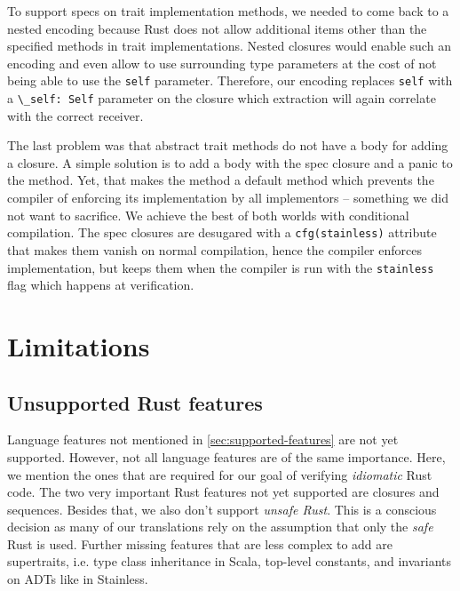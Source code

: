 To support specs on trait implementation methods, we needed to come back
to a nested encoding because Rust does not allow additional items other
than the specified methods in trait implementations. Nested closures
would enable such an encoding and even allow to use surrounding type
parameters at the cost of not being able to use the
\passthrough{\lstinline!self!} parameter. Therefore, our encoding
replaces \passthrough{\lstinline!self!} with a
\passthrough{\lstinline!\_self: Self!} parameter on the closure which
extraction will again correlate with the correct receiver.

The last problem was that abstract trait methods do not have a body for
adding a closure. A simple solution is to add a body with the spec
closure and a panic to the method. Yet, that makes the method a default
method which prevents the compiler of enforcing its implementation by
all implementors -- something we did not want to sacrifice. We achieve
the best of both worlds with conditional compilation. The spec closures
are desugared with a \passthrough{\lstinline!cfg(stainless)!} attribute
that makes them vanish on normal compilation, hence the compiler
enforces implementation, but keeps them when the compiler is run with
the \passthrough{\lstinline!stainless!} flag which happens at
verification.



\section{Limitations}
\label{impl-limitations}

\subsection{Unsupported Rust features}

Language features not mentioned in \autoref{sec:supported-features} are not yet
supported. However, not all language features are of the same importance. Here,
we mention the ones that are required for our goal of verifying \emph{idiomatic}
Rust code. The two very important Rust features not yet supported are closures
and sequences. Besides that, we also don't support \emph{unsafe Rust}. This is a
conscious decision as many of our translations rely on the assumption that only
the \emph{safe} Rust is used. Further missing features that are less complex to
add are supertraits, i.e. type class inheritance in Scala, top-level constants,
and invariants on ADTs like in Stainless.

